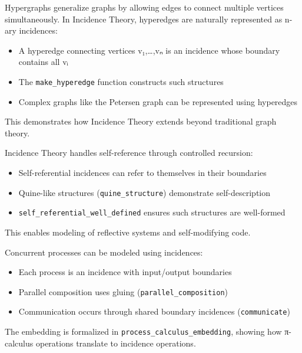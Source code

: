 \documentclass{article}
\begin{document}
\begin{example}[Hypergraphs]
\label{ex:hypergraphs}
Hypergraphs generalize graphs by allowing edges to connect multiple vertices simultaneously. In Incidence Theory, hyperedges are naturally represented as n-ary incidences:

\begin{itemize}
\item A hyperedge connecting vertices v₁,…,vₙ is an incidence whose boundary contains all vᵢ
\item The \texttt{make\_hyperedge} function constructs such structures
\item Complex graphs like the Petersen graph can be represented using hyperedges
\end{itemize}

This demonstrates how Incidence Theory extends beyond traditional graph theory.
\end{example}

\begin{example}
\label{ex:self-reference}
Incidence Theory handles self-reference through controlled recursion:

\begin{itemize}
\item Self-referential incidences can refer to themselves in their boundaries
\item Quine-like structures (\texttt{quine\_structure}) demonstrate self-description
\item \texttt{self\_referential\_well\_defined} ensures such structures are well-formed
\end{itemize}

This enables modeling of reflective systems and self-modifying code.
\end{example}

\begin{example}
\label{ex:process-calculus}
Concurrent processes can be modeled using incidences:

\begin{itemize}
\item Each process is an incidence with input/output boundaries
\item Parallel composition uses gluing (\texttt{parallel\_composition})
\item Communication occurs through shared boundary incidences (\texttt{communicate})
\end{itemize}

The embedding is formalized in \texttt{process\_calculus\_embedding}, showing how π-calculus operations translate to incidence operations.
\end{example}
\end{document}
